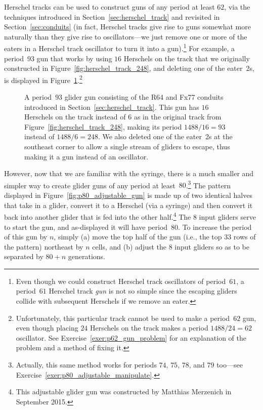 Herschel tracks can be used to construct guns of any period at least $62$, via the techniques introduced in Section~\ref{sec:herschel_track} and revisited in Section~\ref{sec:conduits} (in fact, Herschel tracks give rise to guns somewhat more naturally than they give rise to oscillators---we just remove one or more of the eaters in a Herschel track oscillator to turn it into a gun).\footnote{Even though we could construct Herschel track oscillators of period~$61$, a period~$61$ Herschel track \emph{gun} is not so simple since the escaping gliders collide with subsequent Herschels if we remove an eater.} For example, a period~$93$ gun that works by using $16$ Herschels on the track that we originally constructed in Figure~\ref{fig:herschel_track_248}, and deleting one of the eater~2s, is displayed in Figure~\ref{fig:p93_gun}.\footnote{Unfortunately, this particular track cannot be used to make a period~$62$ gun, even though placing $24$ Herschels on the track makes a period $1488/24 = 62$ oscillator. See Exercise~\ref{exer:p62_gun_problem} for an explanation of the problem and a method of fixing it.}

\begin{figure}[!ht]
	\centering
	\caption{A period~$93$ glider gun consisting of the R64 and Fx77 conduits introduced in Section~\ref{sec:herschel_track}. This gun has $16$ Herschels on the track instead of $6$ as in the original track from Figure~\ref{fig:herschel_track_248}, making its period $1488/16 = 93$ instead of $1488/6 = 248$. We also deleted one of the eater~2s at the southeast corner to allow a single stream of gliders to escape, thus making it a gun instead of an oscillator.}\label{fig:p93_gun}
\end{figure}

However, now that we are familiar with the syringe, there is a much smaller and simpler way to create glider guns of any period at least~$80$.\footnote{Actually, this same method works for periods $74$, $75$, $78$, and $79$ too---see Exercise~\ref{exer:p80_adjustable_manipulate}.} The pattern displayed in Figure~\ref{fig:p80_adjustable_gun} is made up of two identical halves that take in a glider, convert it to a Herschel (via a syringe) and then convert it back into another glider that is fed into the other half.\footnote{This adjustable glider gun was constructed by Matthias Merzenich in September 2015.} The $8$ input gliders serve to start the gun, and as-displayed it will have period~$80$. To increase the period of this gun by $n$, simply (a) move the top half of the gun (i.e., the top $33$ rows of the pattern) northeast by $n$ cells, and (b) adjust the $8$ input gliders so as to be separated by $80+n$ generations.


